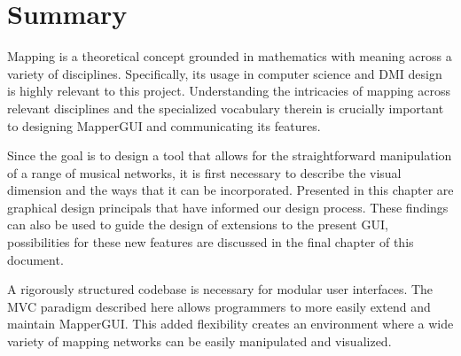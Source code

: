 
\section{Summary} %
\label{sec:background_summary}

Mapping is a theoretical concept grounded in mathematics with meaning across a variety of disciplines. Specifically, its usage in computer science and DMI design is highly relevant to this project. Understanding the intricacies of mapping across relevant disciplines and the specialized vocabulary therein is crucially important to designing MapperGUI and communicating its features.

Since the goal is to design a tool that allows for the straightforward manipulation of a range of musical networks, it is first necessary to describe the visual dimension and the ways that it can be incorporated. Presented in this chapter are graphical design principals that have informed our design process. These findings can also be used to guide the design of extensions to the present GUI, possibilities for these new features are discussed in the final chapter of this document. 

A rigorously structured codebase is necessary for modular user interfaces. The MVC paradigm described here allows programmers to more easily extend and maintain MapperGUI. This added flexibility creates an environment where a wide variety of mapping networks can be easily manipulated and visualized.


	